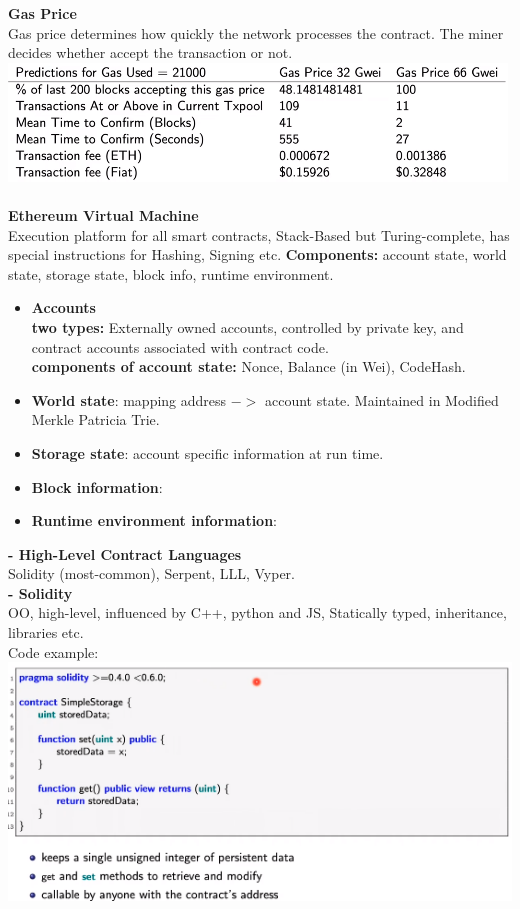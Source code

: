 \documentclass{article}
\begin{document}
\textbf{Gas Price}\\
Gas price determines how quickly the network processes the contract. The miner decides whether accept the transaction or not.
\includegraphics[scale=0.7]{53.png}\\\\
\textbf{Ethereum Virtual Machine}\\
Execution platform for all smart contracts, Stack-Based but Turing-complete, has special instructions for Hashing, Signing etc. \textbf{Components: }account state, world state, storage state, block info, runtime environment.
\begin{itemize}
    \item \textbf{Accounts}\\
    \textbf{two types: }Externally owned accounts, controlled by private key, and contract accounts associated with contract code.\\
    \textbf{components of account state: } Nonce, Balance (in Wei), CodeHash.
    \item \textbf{World state}: mapping address $->$ account state. Maintained in Modified Merkle Patricia Trie.
    \item \textbf{Storage state}: account specific information at run time.
    \item \textbf{Block information}: 
    \item \textbf{Runtime environment information}:
\end{itemize}
\textbf{- High-Level Contract Languages}\\
Solidity (most-common), Serpent, LLL, Vyper.\\
\textbf{- Solidity}\\
OO, high-level, influenced by C++, python and JS, Statically typed, inheritance, libraries etc.\\
Code example: \\
\includegraphics[scale=0.7]{54.png}\\
\end{document}
